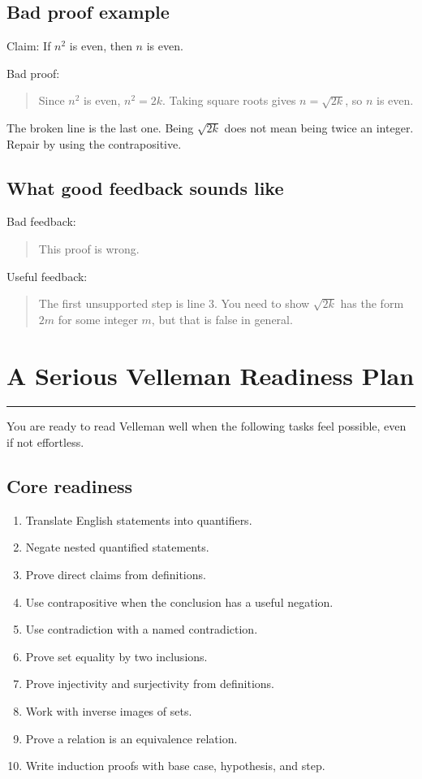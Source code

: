 \documentclass[12pt]{article}
\newcommand{\chapterline}{\vspace{0.4em}\hrule\vspace{0.8em}}
\begin{document}
\subsection{Bad proof example}

Claim: If $n^2$ is even, then $n$ is even.

Bad proof:

\begin{quote}
Since $n^2$ is even, $n^2=2k$. Taking square roots gives $n=\sqrt{2k}$, so $n$ is even.
\end{quote}

The broken line is the last one. Being $\sqrt{2k}$ does not mean being twice an integer. Repair by using the contrapositive.

\subsection{What good feedback sounds like}

Bad feedback:

\begin{quote}
This proof is wrong.
\end{quote}

Useful feedback:

\begin{quote}
The first unsupported step is line 3. You need to show $\sqrt{2k}$ has the form $2m$ for some integer $m$, but that is false in general.
\end{quote}

\newpage
\section{A Serious Velleman Readiness Plan}
\chapterline

You are ready to read Velleman well when the following tasks feel possible, even if not effortless.

\subsection{Core readiness}

\begin{enumerate}
\item Translate English statements into quantifiers.
\item Negate nested quantified statements.
\item Prove direct claims from definitions.
\item Use contrapositive when the conclusion has a useful negation.
\item Use contradiction with a named contradiction.
\item Prove set equality by two inclusions.
\item Prove injectivity and surjectivity from definitions.
\item Work with inverse images of sets.
\item Prove a relation is an equivalence relation.
\item Write induction proofs with base case, hypothesis, and step.
\end{enumerate}
\end{document}

